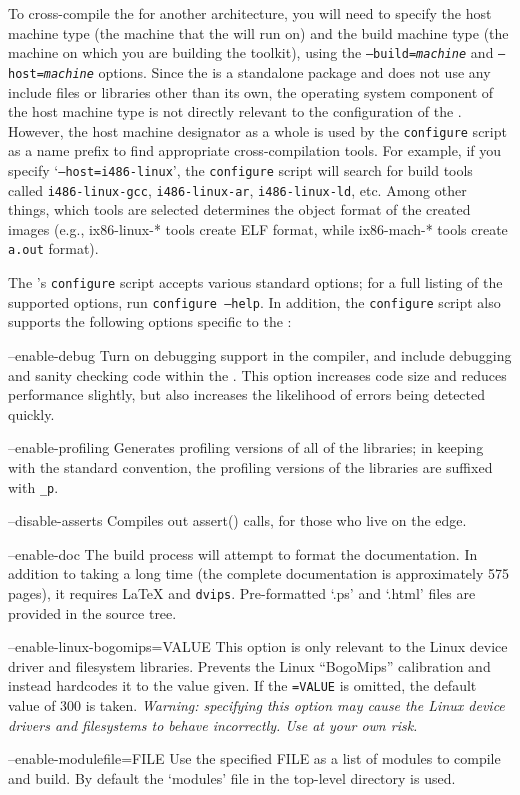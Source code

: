 To cross-compile the \oskit{} for another architecture,
you will need to specify the host machine type
(the machine that the \oskit{} will run on)
and the build machine type
(the machine on which you are building the toolkit),
using the {\tt --build=\emph{machine}} and {\tt --host=\emph{machine}} options.
Since the \oskit{} is a standalone package
and does not use any include files or libraries other than its own,
the operating system component of the host machine type
is not directly relevant to the configuration of the \oskit{}.
However, the host machine designator as a whole
is used by the {\tt configure} script as a name prefix
to find appropriate cross-compilation tools.
For example, if you specify `{\tt --host=i486-linux}',
the {\tt configure} script will search for build tools called
{\tt i486-linux-gcc}, {\tt i486-linux-ar}, {\tt i486-linux-ld}, etc.
Among other things, which tools are selected determines the object format
of the created images (e.g., ix86-linux-* tools create ELF format,
while ix86-mach-* tools create {\tt a.out} format).

The \oskit{}'s \texttt{configure} script
accepts various standard options;
for a full listing of the supported options,
run {\tt configure --help}.
In addition, the \texttt{configure} script
also supports the following options specific to the \oskit:
\begin{icsymlist}
\item[--enable-debug]
	Turn on debugging support in the compiler, and
	include debugging and sanity checking code within the \oskit{}.
	This option increases code size and reduces performance slightly,
	but also increases the likelihood of errors being detected quickly.
\item[--enable-profiling]
	Generates profiling versions of all of the \oskit{} libraries;
	in keeping with the standard convention,
	the profiling versions of the libraries are suffixed with \texttt{_p}.
\item[--disable-asserts]
	Compiles out assert() calls, for those who live on the edge.
\item[--enable-doc]
	The build process will attempt to format the \oskit{} documentation.
	In addition to taking a long time (the complete documentation is
	approximately 575 pages), it requires \LaTeX{} and \texttt{dvips}.
	Pre-formatted `.ps' and `.html' files are provided in the source tree.
\item[--enable-linux-bogomips=VALUE]
	This option is only relevant to the Linux device driver and
	filesystem libraries.
	Prevents the Linux ``BogoMips'' calibration and instead hardcodes
	it to the value given.
	If the \texttt{=VALUE} is omitted, the default value of 300 is taken.
	\emph{Warning: specifying this option may cause the Linux device
	drivers and filesystems to behave incorrectly.
	Use at your own risk.}
\item[--enable-modulefile=FILE]
	Use the specified FILE as a list of modules to compile and build.
        By default the `modules' file in the top-level directory is used.
\end{icsymlist}

